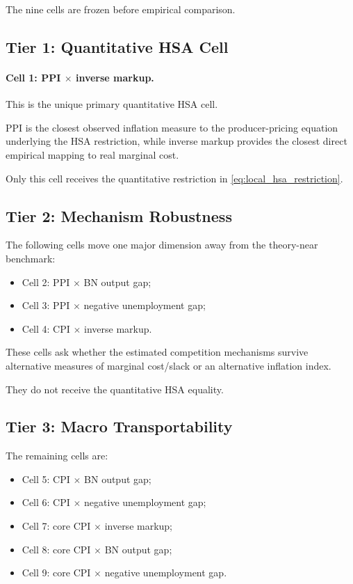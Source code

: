 \documentclass[11pt]{article}
\begin{document}
The nine cells are frozen before empirical comparison.

\subsection{Tier 1: Quantitative HSA Cell}

\paragraph{Cell 1: PPI \(\times\) inverse markup.}
This is the unique primary quantitative HSA cell.

PPI is the closest observed inflation measure to the producer-pricing equation underlying the HSA restriction, while inverse markup provides the closest direct empirical mapping to real marginal cost.

Only this cell receives the quantitative restriction in \cref{eq:local_hsa_restriction}.

\subsection{Tier 2: Mechanism Robustness}

The following cells move one major dimension away from the theory-near benchmark:
\begin{itemize}
\item Cell 2: PPI \(\times\) BN output gap;
\item Cell 3: PPI \(\times\) negative unemployment gap;
\item Cell 4: CPI \(\times\) inverse markup.
\end{itemize}

These cells ask whether the estimated competition mechanisms survive alternative measures of marginal cost/slack or an alternative inflation index.

They do not receive the quantitative HSA equality.

\subsection{Tier 3: Macro Transportability}

The remaining cells are:
\begin{itemize}
\item Cell 5: CPI \(\times\) BN output gap;
\item Cell 6: CPI \(\times\) negative unemployment gap;
\item Cell 7: core CPI \(\times\) inverse markup;
\item Cell 8: core CPI \(\times\) BN output gap;
\item Cell 9: core CPI \(\times\) negative unemployment gap.
\end{itemize}
\end{document}
